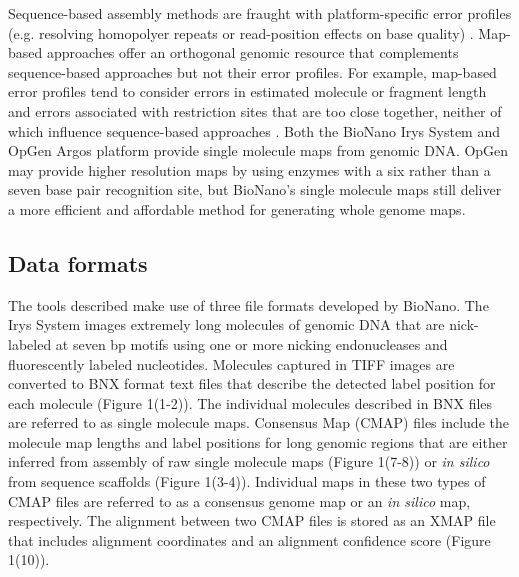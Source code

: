 \documentclass{bmcart}
\begin{document}


Sequence-based assembly methods are fraught with platform-specific error profiles (e.g. resolving homopolyer repeats or read-position effects on base quality) \cite{SeqBias2013}. Map-based approaches offer an orthogonal genomic resource that complements sequence-based approaches but not their error profiles. For example, map-based error profiles tend to consider errors in estimated molecule or fragment length and errors associated with restriction sites that are too close together, neither of which influence sequence-based approaches \cite{OpGenAnalysis2014,BioNanoSV2014}. Both the BioNano Irys System and OpGen Argos platform provide single molecule maps from genomic DNA. OpGen may provide higher resolution maps by using enzymes with a six rather than a seven base pair recognition site, but BioNano's single molecule maps still deliver a more efficient and affordable method for generating whole genome maps. 

\subsection*{Data formats}
The tools described make use of three file formats developed by BioNano. The Irys System images extremely long molecules of genomic DNA that are nick-labeled at seven bp motifs using one or more nicking endonucleases and fluorescently labeled nucleotides. Molecules captured in TIFF images are converted to BNX format text files that describe the detected label position for each molecule (Figure 1(1-2)). The individual molecules described in BNX files are referred to as single molecule maps. Consensus Map (CMAP) files include the molecule map lengths and label positions for long genomic regions that are either inferred from assembly of raw single molecule maps (Figure 1(7-8)) or \textit{in silico} from sequence scaffolds (Figure 1(3-4)). Individual maps in these two types of CMAP files are referred to as a consensus genome map or an \textit{in silico} map, respectively. The alignment between two CMAP files is stored as an XMAP file that includes alignment coordinates and an alignment confidence score (Figure 1(10)).
\end{document}
